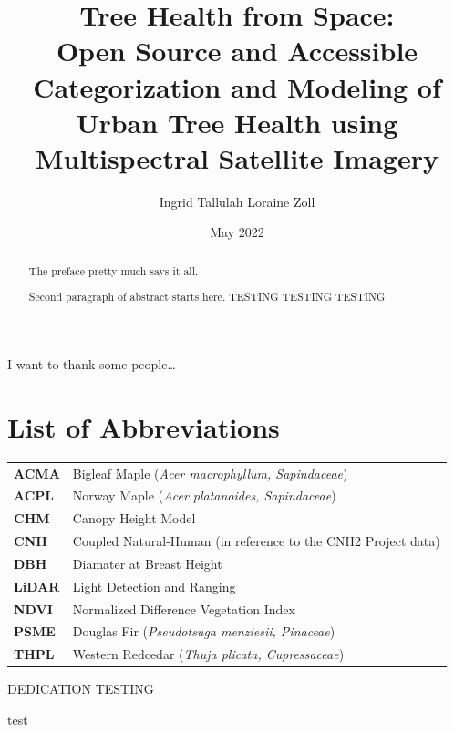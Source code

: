 \documentclass[12pt,twoside]{reedthesis}
\title{Tree Health from Space: \\[1ex] Open Source and Accessible Categorization and Modeling of Urban Tree Health using Multispectral Satellite Imagery}
\author{Ingrid Tallulah Loraine Zoll}
\date{May 2022}
\begin{document}
  \maketitle

\frontmatter %
\pagestyle{empty} %
  \begin{acknowledgements}
    I want to thank some people\ldots{}
  \end{acknowledgements}

\chapter*{List of Abbreviations}
\begin{table}[h]
    \centering
    \begin{tabular}{ll}
                \textbf{ACMA} & Bigleaf Maple (\textit{Acer macrophyllum, Sapindaceae}) \\
                \textbf{ACPL} & Norway Maple (\textit{Acer platanoides, Sapindaceae}) \\
                \textbf{CHM} & Canopy Height Model \\
                \textbf{CNH} & Coupled Natural-Human (in reference to the CNH2 Project data) \\
                \textbf{DBH} & Diamater at Breast Height \\
                \textbf{LiDAR} & Light Detection and Ranging \\
                \textbf{NDVI} & Normalized Difference Vegetation Index \\
                \textbf{PSME} & Douglas Fir (\textit{Pseudotsuga menziesii, Pinaceae}) \\
                \textbf{THPL} & Western Redcedar (\textit{Thuja plicata, Cupressaceae}) \\
            \end{tabular}
\end{table}
  \hypersetup{linkcolor=black}
  \setcounter{secnumdepth}{2}
  \setcounter{tocdepth}{2}
  \tableofcontents

  \listoftables

  \listoffigures
  \begin{abstract}
    The preface pretty much says it all.

    \par

    Second paragraph of abstract starts here.
    TESTING TESTING TESTING
  \end{abstract}
  \begin{dedication}
    DEDICATION TESTING

    test
  \end{dedication}
\mainmatter %
\pagestyle{fancyplain} %
\end{document}
